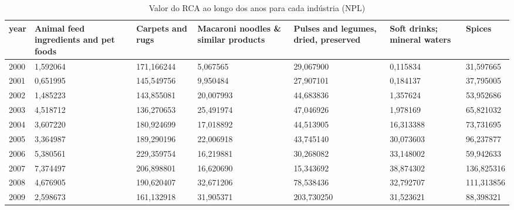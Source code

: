 \begin{table}
\centering
\caption{Valor do RCA ao longo dos anos para cada indústria (NPL)}
\begin{tabular}{p{1cm}p{2cm}p{2cm}p{2cm}p{2cm}p{2cm}p{2cm}}
\toprule
 year &  Animal feed ingredients and pet foods &  Carpets and rugs &  Macaroni noodles \& similar products &  Pulses and legumes, dried, preserved &  Soft drinks; mineral waters &     Spices \\
\midrule
 2000 &                               1,592064 &        171,166244 &                             5,067565 &                             29,067900 &                     0,115834 &  31,597665 \\
 2001 &                               0,651995 &        145,549756 &                             9,950484 &                             27,907101 &                     0,184137 &  37,795005 \\
 2002 &                               1,485223 &        143,855081 &                            20,007993 &                             44,683836 &                     1,357624 &  53,952686 \\
 2003 &                               4,518712 &        136,270653 &                            25,491974 &                             47,046926 &                     1,978169 &  65,821032 \\
 2004 &                               3,607220 &        180,924699 &                            17,018892 &                             44,513905 &                    16,313388 &  73,731695 \\
 2005 &                               3,364987 &        189,290196 &                            22,006918 &                             43,745140 &                    30,073603 &  96,237877 \\
 2006 &                               5,380561 &        229,359754 &                            16,219881 &                             30,268082 &                    33,148002 &  59,942633 \\
 2007 &                               7,374497 &        206,898801 &                            16,620690 &                             15,343692 &                    38,874302 & 136,825316 \\
 2008 &                               4,676905 &        190,620407 &                            32,671206 &                             78,538436 &                    32,792707 & 111,313856 \\
 2009 &                               2,598673 &        161,132918 &                            31,905371 &                            203,730250 &                    31,523621 &  88,398321 \\

\end{tabular}
\end{table}
